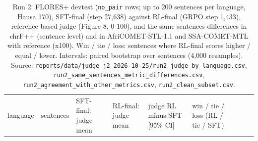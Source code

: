 \begin{table}[t]
\centering
\scriptsize
\setlength{\tabcolsep}{3pt}
\caption{Run 2: FLORES+ devtest (\texttt{no\_pair} rows; up to 200 sentences per language, Hausa 170), SFT-final (step 27,638) against RL-final (GRPO step 1,433), reference-based judge (Figure 8, 0-100), and the same sentences\textquotesingle{} differences in chrF++ (sentence level) and in AfriCOMET-STL-1.1 and SSA-COMET-MTL with reference (x100). Win / tie / loss: sentences where RL-final scores higher / equal / lower. Intervals: paired bootstrap over sentences (4,000 resamples). Source: \texttt{reports/data/judge\_j2\_2026-10-25/run2\_judge\_by\_language.csv}, \texttt{run2\_same\_sentences\_metric\_differences.csv}, \texttt{run2\_agreement\_with\_other\_metrics.csv}, \texttt{run2\_clean\_subset.csv}.}
\label{tab:t_judge_j2_run2}
{\def\LTcaptype{none} %
\begin{tabular}{@{}
  >{\raggedright\arraybackslash}p{}
  >{\raggedleft\arraybackslash}p{}
  >{\raggedleft\arraybackslash}p{}
  >{\raggedleft\arraybackslash}p{}
  >{\raggedleft\arraybackslash}p{}
  >{\raggedleft\arraybackslash}p{}
  >{\raggedleft\arraybackslash}p{}
  >{\raggedleft\arraybackslash}p{}
  >{\raggedleft\arraybackslash}p{}@{}}
\toprule
\begin{minipage}[b]{\linewidth}\raggedright
language
\end{minipage} & \begin{minipage}[b]{\linewidth}\raggedleft
sentences
\end{minipage} & \begin{minipage}[b]{\linewidth}\raggedleft
SFT-final: judge mean
\end{minipage} & \begin{minipage}[b]{\linewidth}\raggedleft
RL-final: judge mean
\end{minipage} & \begin{minipage}[b]{\linewidth}\raggedleft
judge RL minus SFT {[}95\% CI{]}
\end{minipage} & \begin{minipage}[b]{\linewidth}\raggedleft
win / tie / loss (RL / tie / SFT)
\end{minipage} & \begin{minipage}[b]{\linewidth}\raggedleft

\end{minipage}
\end{tabular}}
\end{table}

